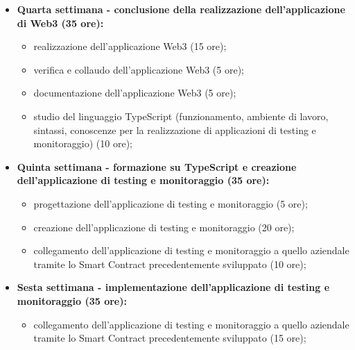 {\begin{itemize}
\begin{itemize}
            \item documentazione dello Smart Contract (5 ore);
            \item studio del linguaggio Node.Js (funzionamento, ambiente di lavoro, sintassi, conoscenze per la realizzazione di un'applicazione Web3 e implementazione di sue funzionalità) (10 ore);
            \item progettazione di un'applicazione Web3 per interagire con una Blockchain (5 ore);
            \item realizzazione dell'applicazione Web3 (5 ore);
        \end{itemize}
        \item \textbf{Quarta settimana - conclusione della realizzazione dell'applicazione di Web3 (35 ore):} 
        \begin{itemize}
            \item realizzazione dell'applicazione Web3 (15 ore);
            \item verifica e collaudo dell'applicazione Web3 (5 ore);
            \item documentazione dell'applicazione Web3 (5 ore);
            \item studio del linguaggio TypeScript (funzionamento, ambiente di lavoro, sintassi, conoscenze per la realizzazione di applicazioni di testing e monitoraggio) (10 ore);
        \end{itemize}
        \newpage
        \item \textbf{Quinta settimana - formazione su TypeScript e creazione dell'applicazione di testing e monitoraggio (35 ore):} 
        \begin{itemize}
            \item progettazione dell'applicazione di testing e monitoraggio (5 ore);
            \item creazione dell'applicazione di testing e monitoraggio (20 ore);
            \item collegamento dell'applicazione di testing e monitoraggio a quello aziendale tramite lo Smart Contract precedentemente sviluppato (10 ore);
        \end{itemize}
        \item \textbf{Sesta settimana - implementazione dell'applicazione di testing e monitoraggio (35 ore):} 
        \begin{itemize}
            \item collegamento dell'applicazione di testing e monitoraggio a quello aziendale tramite lo Smart Contract precedentemente sviluppato (15 ore);

\end{itemize}
\end{itemize}}
